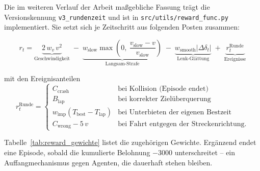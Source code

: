 Die im weiteren Verlauf der Arbeit maßgebliche Fassung trägt die Versionskennung \texttt{v3\_rundenzeit} und ist in \texttt{src/utils/reward\_func.py} implementiert. Sie setzt sich je Zeitschritt aus folgenden Posten zusammen:

\begin{equation}
  r_t =
  \underbrace{2\, w_v\, v^2}_{\text{Geschwindigkeit}}
  \;-\; \underbrace{w_{\text{slow}} \max\!\left(0,\ \frac{v_{\text{slow}} - v}{v_{\text{slow}}}\right)}_{\text{Langsam-Strafe}}
  \;-\; \underbrace{w_{\text{smooth}} \left|\Delta \delta_t\right|}_{\text{Lenk-Glättung}}
  \;+\; \underbrace{r^{\text{Runde}}_t}_{\text{Ereignisse}}
  \label{eq:reward}
\end{equation}

mit den Ereignisanteilen
\begin{equation}
  r^{\text{Runde}}_t =
  \begin{cases}
    C_{\text{crash}} & \text{bei Kollision (Episode endet)} \\
    B_{\text{lap}} & \text{bei korrekter Zielüberquerung} \\
    w_{\text{imp}} \left( T_{\text{best}} - T_{\text{lap}} \right) & \text{bei Unterbieten der eigenen Bestzeit} \\
    C_{\text{wrong}} - 5\,v & \text{bei Fahrt entgegen der Streckenrichtung.}
  \end{cases}
  \label{eq:reward_events}
\end{equation}

Tabelle~\ref{tab:reward_gewichte} listet die zugehörigen Gewichte. Ergänzend endet eine Episode, sobald die kumulierte Belohnung $-3000$ unterschreitet -- ein Auffangmechanismus gegen Agenten, die dauerhaft stehen bleiben.

